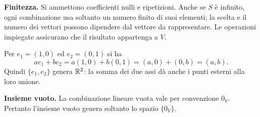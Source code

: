 \textbf{Finitezza.} Si ammettono coefficienti nulli e ripetizioni. Anche se $S$ è infinito, ogni combinazione usa soltanto un numero finito di suoi elementi; la scelta e il numero dei vettori possono dipendere dal vettore da rappresentare. Le operazioni impiegate assicurano che il risultato appartenga a $V$.

\begin{esempio}
Per $e_1=(1,0)$ ed $e_2=(0,1)$ si ha
\[
  ae_1+be_2=a(1,0)+b(0,1)=(a,0)+(0,b)=(a,b).
\]
Quindi $\{e_1,e_2\}$ genera $\mathbb{R}^2$: la somma dei due assi dà anche i punti esterni alla loro unione.
\end{esempio}

\textbf{Insieme vuoto.} La combinazione lineare vuota vale per convenzione $0_V$. Pertanto l'insieme vuoto genera soltanto lo spazio $\{0_V\}$.
